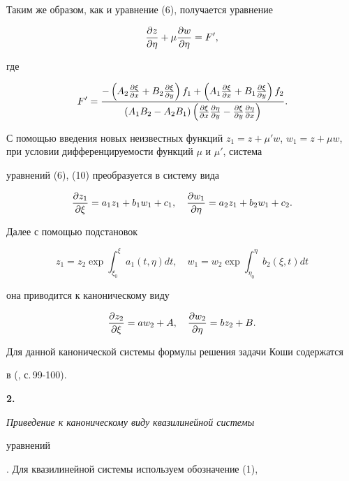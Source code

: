 Таким же образом, как и уравнение (6), получается уравнение 


\begin{equation} 


\myfrac{z}{\eta}+\mu\myfrac{w}{\eta}=F', 


\end{equation} 


где 


$$ 


F'=\frac{-\left(A_2\myfrac{\xi}{x}+B_2\myfrac{\xi}{y}\right)f_1+ 


\left(A_1\myfrac{\xi}{x}+B_1\myfrac{\xi}{y}\right)f_2} 


{(A_1B_2-A_2B_1)\left(\myfrac{\xi}{x}\myfrac{\eta}{y}- 


\myfrac{\xi}{y}\myfrac{\eta}{x}\right)}. 


$$ 


С помощью введения новых неизвестных функций $z_1=z+\mu'w$, $w_1=z+\mu 


w$, при условии дифференцируемости функций $\mu$ и $\mu'$, система 


уравнений (6), (10) преобразуется в систему вида 


$$ 


\myfrac{z_1}{\xi}=a_1z_1+b_1w_1+c_1,\quad 


\myfrac{w_1}{\eta}=a_2z_1+b_2w_1+c_2.


$$ 


Далее с помощью подстановок 


$$ 


z_1=z_2\exp\int^\xi_{\xi_0}a_1(t,\eta)dt,\quad 


w_1=w_2\exp\int^\eta_{\eta_0}b_2(\xi,t)dt 


$$ 


она приводится к каноническому виду 


$$ 


\myfrac{z_2}{\xi}=a w_2+A,\quad 


\myfrac{w_2}{\eta}=b z_2+B. 


$$ 


Для данной канонической системы формулы решения задачи Коши содержатся 


в (\cite{3}, с.\,99-100). 


\medskip 


 


{\bf 2.} {\it Приведение к каноническому виду квазилинейной системы 


уравнений}. Для квазилинейной системы используем обозначение (1), 


